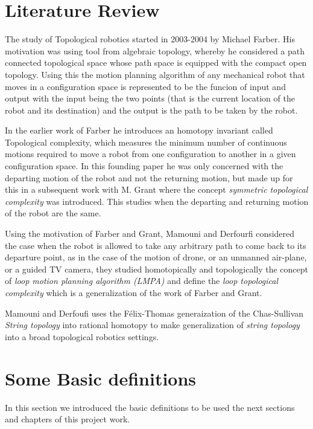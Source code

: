 \documentclass[a4paper, 12pt]{scrbook}
\theoremstyle{definition}
\begin{document}
    \section{Literature Review}
    The study of Topological robotics started in 2003-2004 by Michael Farber. His motivation was using tool from algebraic topology, whereby he considered a path connected topological space whose path space is equipped with the compact open topology. Using this the motion planning algorithm of any mechanical robot that moves in a configuration space is represented to be the funcion of input and output with the input being the two points (that is the current location of the robot and its destination) and the output is the path to be taken by the robot.

    In the earlier work of Farber he introduces an homotopy invariant called Topological complexity, which measures the minimum number of continuous motions required to move a robot from one configuration to another in a given configuration space. In this founding paper he was only concerned with the departing motion of the robot and not the returning motion, but made up for this in a subsequent work with M. Grant where the concept \textit{symmetric topological complexity} was introduced. This studies when the departing and returning motion of the robot are the same.

    Using the motivation of Farber and Grant, Mamouni and Derfourfi considered the case when the robot is allowed to take any arbitrary path to come back to its departure point, as in the case of the motion of drone, or an unmanned air-plane, or a guided TV camera, they studied homotopically and topologically the concept of \textit{loop motion planning algorithm (LMPA)}  and define the \textit{loop topological complexity} which is a generalization of the work of Farber and Grant.
    
    Mamouni and Derfoufi uses the F\'elix-Thomas generaization of the Chas-Sullivan \textit{String topology} into rational homotopy to make generalization of \textit{string topology} into a broad topological robotics settings.

    \section{Some Basic definitions}
    In this section we introduced the basic definitions to be used the next sections and chapters of this project work.
\end{document}
